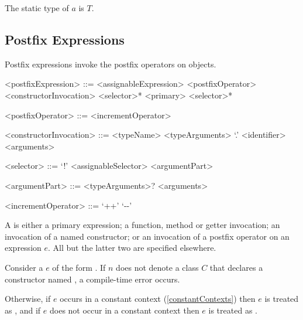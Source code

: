 \documentclass[makeidx]{article}
\begin{document}
{


\LMHash{}%
The static type of $a$ is $T$.


\subsection{Postfix Expressions}

\LMHash{}%
Postfix expressions invoke the postfix operators on objects.

\begin{grammar}
<postfixExpression> ::= <assignableExpression> <postfixOperator>
  \alt <constructorInvocation> <selector>*
  \alt <primary> <selector>*

<postfixOperator> ::= <incrementOperator>

<constructorInvocation> ::= \gnewline{}
  <typeName> <typeArguments> `.' <identifier> <arguments>

<selector> ::= `!'
  \alt <assignableSelector>
  \alt <argumentPart>

<argumentPart> ::=
  <typeArguments>? <arguments>

<incrementOperator> ::= `++'
  \alt `-\mbox-'
\end{grammar}

\LMHash{}%
A  is either a primary expression;
a function, method or getter invocation;
an invocation of a named constructor;
or an invocation of a postfix operator on an expression $e$.
All but the latter two are specified elsewhere.

\LMHash{}%
Consider a  $e$ of the form
.
If $n$ does not denote a class $C$
that declares a constructor named ,
a compile-time error occurs.

\LMHash{}%
Otherwise, if $e$ occurs in a constant context
(\ref{constantContexts})
then $e$ is treated as ,
and if $e$ does not occur in a constant context
then $e$ is treated as .

\EndCase

}
\end{document}
